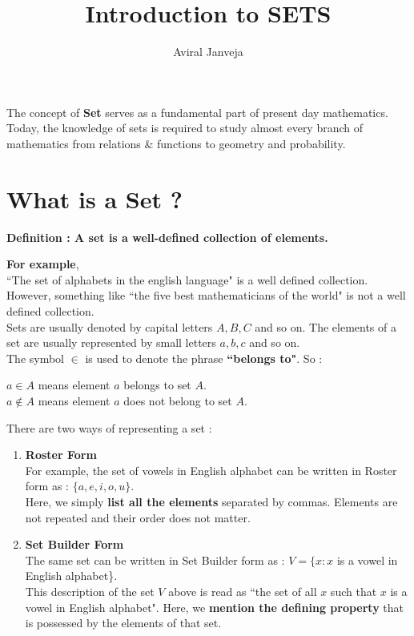 \documentclass[12pt, letterpaper]{article}
\title{\textbf{\Huge Introduction to SETS}}
\author{Aviral Janveja}
\date{}
\begin{document}
\maketitle

The concept of \textbf{Set} serves as a fundamental part of present day mathematics.\\ 
Today, the knowledge of sets is required to study almost every branch of mathematics from relations \& functions to geometry and probability.

\section{What is a Set ?}
\begin{displayquote}
\textbf{Definition : A set is a well-defined collection of elements.}
\end{displayquote}
\textbf{For example},\\ 
``The set of alphabets in the english language" is a well defined collection. However, something like ``the five best mathematicians of the world" is not a well defined collection.\\
Sets are usually denoted by capital letters $A, B, C$ and so on. The elements of a set are usually represented by small letters $a, b, c$ and so on.\\
The symbol $\mathbf{\in}$ is used to denote the phrase \textbf{``belongs to"}. So : 
\begin{displayquote}
$a \in A$ means element $a$ belongs to set $A$.\\
$a \notin A$ means element $a$ does not belong to set $A$.
\end{displayquote}
There are two ways of representing a set : 
\begin{enumerate}
    \item \textbf{Roster Form}\\
    For example, the set of vowels in English alphabet can be written in Roster form as : $\{a,e,i,o,u\}$.\\
    Here, we simply \textbf{list all the elements} separated by commas. Elements are not repeated and their order does not matter.
    \item \textbf{Set Builder Form}\\
    The same set can be written in Set Builder form as : $V = \{x : x$ is a vowel in English alphabet\}.\\
    This description of the set $V$ above is read as ``the set of all $x$ such that $x$ is a vowel in English alphabet". Here, we \textbf{mention the defining property} that is possessed by the elements of that set.
\end{enumerate}
\end{document}
